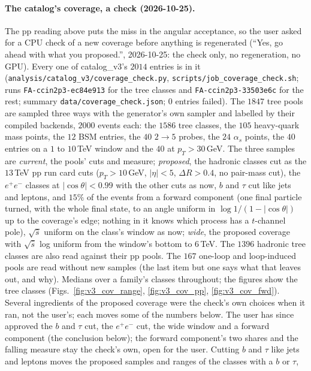 \documentclass[11pt]{article}
\newcommand{\code}[1]{\texttt{#1}}
\begin{document}
\paragraph{The catalog's coverage, a check (2026-10-25).} The pp reading above puts the miss in the angular acceptance,
so the user asked for a CPU check of a new coverage before anything is regenerated (``Yes, go ahead with what you
proposed.'', 2026-10-25: the check only, no regeneration, no GPU). Every one of catalog\_v3's $2014$ entries is in it
(\code{analysis/catalog\_v3/coverage\_check.py}, \code{scripts/job\_coverage\_check.sh}; runs \code{FA-ccin2p3-ec84e913}
for the tree classes and \code{FA-ccin2p3-33503e6c} for the rest; summary \code{data/coverage\_check.json}; $0$ entries
failed). The $1847$ tree pools are sampled three ways with the generator's own sampler and labelled by their compiled
backends, $2000$ events each: the $1586$ tree classes, the $105$ heavy-quark mass points, the $12$ BSM entries, the
$40$ $2\to5$ probes, the $24$ $\alpha_s$ points, the $40$ entries on a $1$ to $10$\,TeV window and the $40$ at
$p_T>30$\,GeV. The three samples are \emph{current}, the pools' cuts and measure; \emph{proposed}, the hadronic
classes cut as the $13$\,TeV pp run card cuts ($p_T>10$\,GeV, $|\eta|<5$, $\Delta R>0.4$, no pair-mass cut), the
$e^+e^-$ classes at $|\cos\theta|<0.99$ with the other cuts as now, $b$ and $\tau$ cut like jets and leptons, and $15\%$
of the events from a forward component (one final particle turned, with the whole final state, to an angle uniform in
$\log 1/(1-|\cos\theta|)$ up to the coverage's edge; nothing in it knows which process has a $t$-channel pole),
$\sqrt{\hat s}$ uniform on the class's window as now; \emph{wide}, the proposed coverage with $\sqrt{\hat s}$ log
uniform from the window's bottom to $6$\,TeV. The $1396$ hadronic tree classes are also read against their pp pools.
The $167$ one-loop and loop-induced pools are read without new samples (the last item but one says what that leaves
out, and why). Medians over a family's classes throughout; the figures show the tree classes
(Figs.~\ref{fig:v3_cov_range}, \ref{fig:v3_cov_pp}, \ref{fig:v3_cov_fwd}). Several ingredients of the proposed
coverage were the check's own choices when it ran, not the user's; each moves some of the numbers below. The user has
since approved the $b$ and $\tau$ cut, the $e^+e^-$ cut, the wide window and a forward component (the conclusion
below); the forward component's two shares and the falling measure stay the check's own, open for the user.
Cutting $b$ and $\tau$ like jets and leptons moves the proposed samples and ranges of the classes with a $b$ or $\tau$,
\end{document}
